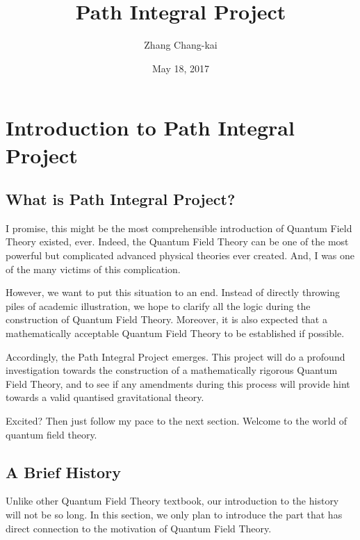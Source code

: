 \documentclass[letterpaper,10pt,english]{sphinxmanual}
\title{Path Integral Project}
\date{May 18, 2017}
\author{Zhang Chang-kai}
\begin{document}
\maketitle
\sphinxtableofcontents
{}\label{\detokenize{index::doc}}



\chapter{Introduction to Path Integral Project}
\label{\detokenize{intro:introduction-to-path-integral-project}}\label{\detokenize{intro:path-integral-project}}\label{\detokenize{intro::doc}}

\section{What is Path Integral Project?}
\label{\detokenize{intro_what:what-is-path-integral-project}}\label{\detokenize{intro_what::doc}}
I promise, this might be the most comprehensible introduction of Quantum Field Theory existed, ever. Indeed, the Quantum Field Theory can be one of the most powerful but complicated advanced physical theories ever created. And, I was one of the many victims of this complication.

However, we want to put this situation to an end. Instead of directly throwing piles of academic illustration, we hope to clarify all the logic during the construction of Quantum Field Theory. Moreover, it is also expected that a mathematically acceptable Quantum Field Theory to be established if possible.

Accordingly, the Path Integral Project emerges. This project will do a profound investigation towards the construction of a mathematically rigorous Quantum Field Theory, and to see if any amendments during this process will provide hint towards a valid quantised gravitational theory.

Excited? Then just follow my pace to the next section. Welcome to the world of quantum field theory.


\section{A Brief History}
\label{\detokenize{intro_history:a-brief-history}}\label{\detokenize{intro_history::doc}}
Unlike other Quantum Field Theory textbook, our introduction to the history will not be so long. In this section, we only plan to introduce the part that has direct connection to the motivation of Quantum Field Theory.
\end{document}
